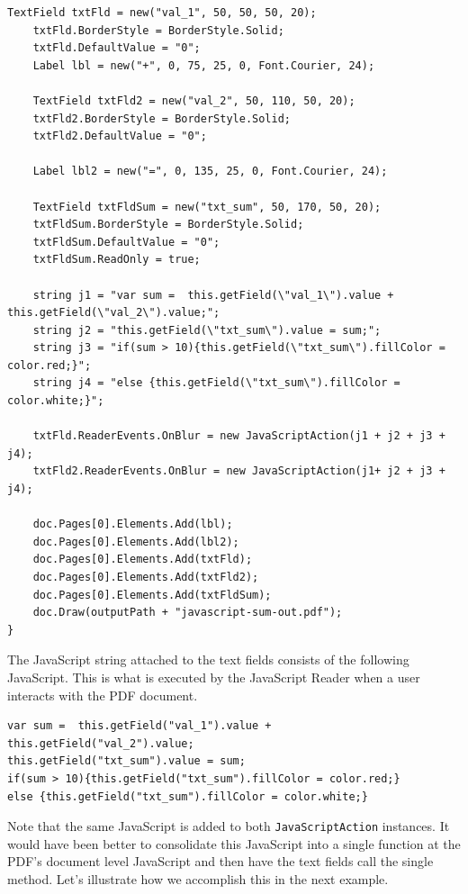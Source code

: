\documentclass[american,letterpaper]{tufte-book}
\numberwithin{equation}{section}
\numberwithin{figure}{section}
\begin{document}
{{\begin{lstlisting}[caption={JavaScript that sums two values.},label={lis:JavaScript-that-sums},basicstyle={\small\ttfamily},breaklines=true]
    TextField txtFld = new("val_1", 50, 50, 50, 20);
    txtFld.BorderStyle = BorderStyle.Solid;
    txtFld.DefaultValue = "0";
    Label lbl = new("+", 0, 75, 25, 0, Font.Courier, 24);

    TextField txtFld2 = new("val_2", 50, 110, 50, 20);
    txtFld2.BorderStyle = BorderStyle.Solid;
    txtFld2.DefaultValue = "0";

    Label lbl2 = new("=", 0, 135, 25, 0, Font.Courier, 24);

    TextField txtFldSum = new("txt_sum", 50, 170, 50, 20);
    txtFldSum.BorderStyle = BorderStyle.Solid;
    txtFldSum.DefaultValue = "0";
    txtFldSum.ReadOnly = true;

    string j1 = "var sum =  this.getField(\"val_1\").value + this.getField(\"val_2\").value;";
    string j2 = "this.getField(\"txt_sum\").value = sum;";            
    string j3 = "if(sum > 10){this.getField(\"txt_sum\").fillColor = color.red;}";
    string j4 = "else {this.getField(\"txt_sum\").fillColor = color.white;}";

    txtFld.ReaderEvents.OnBlur = new JavaScriptAction(j1 + j2 + j3 + j4);            
    txtFld2.ReaderEvents.OnBlur = new JavaScriptAction(j1+ j2 + j3 + j4);

    doc.Pages[0].Elements.Add(lbl);
    doc.Pages[0].Elements.Add(lbl2);
    doc.Pages[0].Elements.Add(txtFld);
    doc.Pages[0].Elements.Add(txtFld2);
    doc.Pages[0].Elements.Add(txtFldSum);
    doc.Draw(outputPath + "javascript-sum-out.pdf");
}
\end{lstlisting}
\leavevmode\egroup

The JavaScript string attached to the text fields consists of the
following JavaScript. This is what is executed by the JavaScript Reader
when a user interacts with the PDF document.

\bgroup{}
\begin{lstlisting}[basicstyle={\small\ttfamily},breaklines=true]
var sum =  this.getField("val_1").value + this.getField("val_2").value;
this.getField("txt_sum").value = sum;           
if(sum > 10){this.getField("txt_sum").fillColor = color.red;}
else {this.getField("txt_sum").fillColor = color.white;}
\end{lstlisting}
\leavevmode\egroup

Note that the same JavaScript is added to both \texttt{JavaScriptAction}
instances. It would have been better to consolidate this JavaScript
into a single function at the PDF's document level JavaScript and
then have the text fields call the single method. Let's illustrate
how we accomplish this in the next example.

}}
\end{document}
